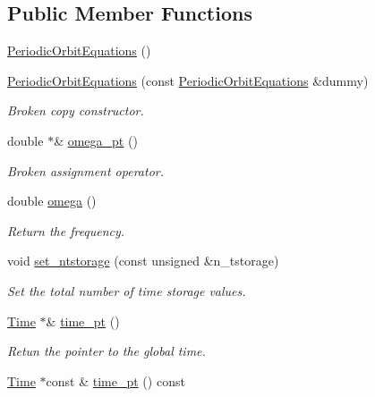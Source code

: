 \subsection*{Public Member Functions}
\begin{DoxyCompactItemize}
\item 
\hyperlink{classoomph_1_1PeriodicOrbitEquations_a75cb0bc88ecc1c76756f2da7910a2c06}{Periodic\+Orbit\+Equations} ()
\item 
\hyperlink{classoomph_1_1PeriodicOrbitEquations_a18dc89c632263d9cbec8c14fefda563b}{Periodic\+Orbit\+Equations} (const \hyperlink{classoomph_1_1PeriodicOrbitEquations}{Periodic\+Orbit\+Equations} \&dummy)
\begin{DoxyCompactList}\small\item\em Broken copy constructor. \end{DoxyCompactList}\item 
double $\ast$\& \hyperlink{classoomph_1_1PeriodicOrbitEquations_a3c9cba05d2827927a61e5e0d742b94a7}{omega\+\_\+pt} ()
\begin{DoxyCompactList}\small\item\em Broken assignment operator. \end{DoxyCompactList}\item 
double \hyperlink{classoomph_1_1PeriodicOrbitEquations_ae301cd215d5c6aff365fd077ff8055de}{omega} ()
\begin{DoxyCompactList}\small\item\em Return the frequency. \end{DoxyCompactList}\item 
void \hyperlink{classoomph_1_1PeriodicOrbitEquations_aaed37b9539f2f77d642a18fdd1e13e88}{set\+\_\+ntstorage} (const unsigned \&n\+\_\+tstorage)
\begin{DoxyCompactList}\small\item\em Set the total number of time storage values. \end{DoxyCompactList}\item 
\hyperlink{classoomph_1_1Time}{Time} $\ast$\& \hyperlink{classoomph_1_1PeriodicOrbitEquations_a2886a97c72b03dfd68aeb9f8a5490b4f}{time\+\_\+pt} ()
\begin{DoxyCompactList}\small\item\em Retun the pointer to the global time. \end{DoxyCompactList}\item 
\hyperlink{classoomph_1_1Time}{Time} $\ast$const  \& \hyperlink{classoomph_1_1PeriodicOrbitEquations_aad73f9555bbb811d2bdaa6b659048e93}{time\+\_\+pt} () const

\end{DoxyCompactItemize}
